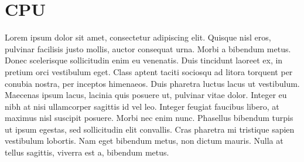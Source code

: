 \section{CPU}

Lorem ipsum dolor sit amet, consectetur adipiscing elit. Quisque nisl eros, 
pulvinar facilisis justo mollis, auctor consequat urna. Morbi a bibendum metus. 
Donec scelerisque sollicitudin enim eu venenatis. Duis tincidunt laoreet ex, 
in pretium orci vestibulum eget. Class aptent taciti sociosqu ad litora torquent
per conubia nostra, per inceptos himenaeos. Duis pharetra luctus lacus ut 
vestibulum. Maecenas ipsum lacus, lacinia quis posuere ut, pulvinar vitae dolor.
Integer eu nibh at nisi ullamcorper sagittis id vel leo. Integer feugiat 
faucibus libero, at maximus nisl suscipit posuere. Morbi nec enim nunc. 
Phasellus bibendum turpis ut ipsum egestas, sed sollicitudin elit convallis. 
Cras pharetra mi tristique sapien vestibulum lobortis. Nam eget bibendum metus, 
non dictum mauris. Nulla at tellus sagittis, viverra est a, bibendum metus.
